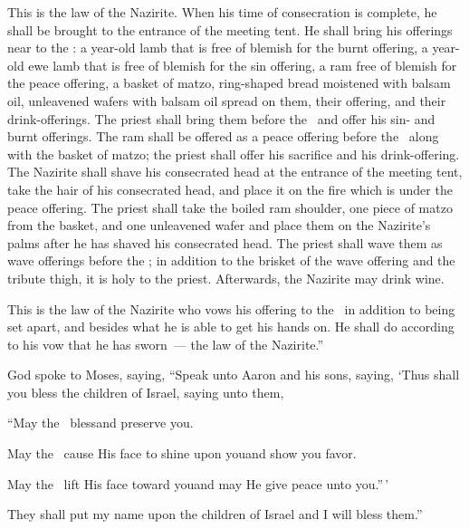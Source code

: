 \begin{inparaenum}
   This is the law of the Nazirite. When his time of consecration is complete, he shall be brought to the entrance of the meeting tent.%
   He shall bring his offerings near to the \lord: a year-old lamb that is free of blemish for the burnt offering, a year-old ewe lamb that is free of blemish for the sin offering, a ram free of blemish for the peace offering,%
   a basket of matzo, ring-shaped bread moistened with balsam oil, unleavened wafers with balsam oil spread on them, their offering, and their drink-offerings.%
   The priest shall bring them before the \lord\ and offer his sin- and burnt offerings.%
   The ram shall be offered as a peace offering before the \lord\ along with the basket of matzo; the priest shall offer his sacrifice and his drink-offering.%
   The Nazirite shall shave his consecrated head at the entrance of the meeting tent, take the hair of his consecrated head, and place it on the fire which is under the peace offering.%
   The priest shall take the boiled ram shoulder, one piece of matzo from the basket, and one unleavened wafer and place them on the Nazirite's palms after he has shaved his consecrated head.%
   The priest shall wave them as wave offerings before the \lord; in addition to the brisket of the wave offering and the tribute thigh, it is holy to the priest. Afterwards, the Nazirite may drink wine.%

   This is the law of the Nazirite who vows his offering to the \lord\ in addition to being set apart, and besides what he is able to get his hands on. He shall do according to his vow that he has sworn~--- the law of the Nazirite.''%

   God spoke to Moses, saying,%
   ``Speak unto Aaron and his sons, saying, `Thus shall you bless the children of Israel, saying unto them,\smallskip%

  \pc{} ``May the \lord\ bless\pa{}and preserve you.%

  \pc{} May the \lord\ cause His face to shine upon you\pa{}and show you favor.%

  \pc{} May the \lord\ lift His face toward you\pa{}and may He give peace unto you.''\,'\smallskip%

   They shall put my name upon the children of Israel and I will bless them.''%
\end{inparaenum}
